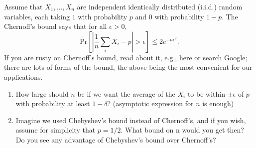 \clearpage
{}

\begin{problem}\label{p2}
Assume that $X_1, \dots , X_n$ are independent identically distributed (i.i.d.)
random variables, each taking $1$ with probability $p$ and $0$ with probability $1 \minus p$. 
The Chernoff’s
bound says that for all $\epsilon > 0$,
\[
\mathrm{Pr}\left[\left|\frac{1}{n} \sum_{i} X_i - p\right| > \epsilon\right] \leq 2e^{\minus n \epsilon^2}.
\]
If you are rusty on Chernoff’s bound, read about it, e.g., here or search Google; there are lots of forms of
the bound, the above being the most convenient for our applications.

\begin{enumerate}[label=(\roman*)]
    \item How large should $n$ be if we want the average of the $X_i$
    to be within $\pm \epsilon$ of $p$ with
    probability at least $1 \minus \delta$? (asymptotic expression for $n$ is enough)
    \item Imagine we used Chebyshev’s bound instead of Chernoff’s, and if you wish, assume for simplicity that $p = 1/2$. What bound on n would you get then? Do you see any advantage of Chebyshev’s bound over Chernoff’s?
\end{enumerate}
\end{problem}

